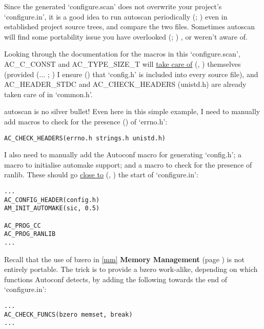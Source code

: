 Since the generated `configure.scan' does not overwrite your 
project's `configure.in', it is a good idea to run autoscan 
periodically ({\MaQ{}}; {\MdQ{}}) even in established project source trees, and 
compare the two files. Sometimes autoscan will find some portability issue 
you have overlooked ({\MbQ{}}; {\MfQ{}}) , or weren't aware of. 

Looking through the documentation for the macros in this `configure.scan',
AC\_{}C\_{}CONST and AC\_{}TYPE\_{}SIZE\_{}T will \underline{take care of}
({\MbQ{}}, {\McQ{}}) themselves (provided ({\MaQ{}}... {\MbQ{}}; {\MaQ{}}) I ensure ({\MaQ{}}) 
that `config.h' is included into every source file),
and AC\_{}HEADER\_{}STDC and AC\_{}CHECK\_{}HEADERS (unistd.h) are already 
taken care of in `common.h'. 

autoscan is no silver bullet! Even here in this simple example, I need to 
manually add macros to check for the presence ({\MaQ{}}) of `errno.h': 

\begin{Verbatim}[frame=single]
AC_CHECK_HEADERS(errno.h strings.h unistd.h)
\end{Verbatim}

I also need to manually add the Autoconf macro for generating `config.h'; a 
macro to initialise automake support; and a macro to check for the presence 
of ranlib. These should go \underline{close to} ({\MbQ{}}, {\MaQ{}}) the 
start of `configure.in': 

\begin{Verbatim}[frame=single]
...
AC_CONFIG_HEADER(config.h)
AM_INIT_AUTOMAKE(sic, 0.5)

AC_PROG_CC
AC_PROG_RANLIB
...
\end{Verbatim}

Recall that the use of bzero 
in \ref{mm} \textbf{Memory Management} (page \pageref{mm}) is 
not entirely portable. The trick is to provide a bzero work-alike, depending on which functions Autoconf detects, by adding the following towards the end of `configure.in':

\begin{Verbatim}[frame=single]
...
AC_CHECK_FUNCS(bzero memset, break)
...
\end{Verbatim}

